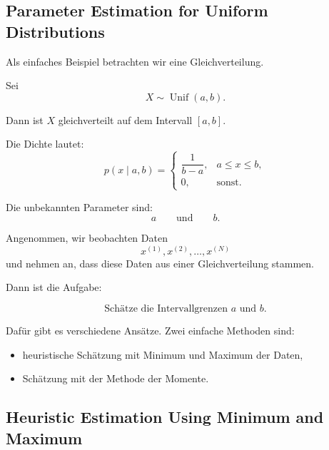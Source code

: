 \documentclass[11pt,a4paper]{scrartcl}
\begin{document}
\subsection{Parameter Estimation for Uniform Distributions}

\begin{notebox}
    Als einfaches Beispiel betrachten wir eine Gleichverteilung.

    Sei
    \[
        X \sim \operatorname{Unif}(a,b).
    \]

    Dann ist \(X\) gleichverteilt auf dem Intervall \([a,b]\).

    Die Dichte lautet:
    \[
        p(x \mid a,b)
        =
        \begin{cases}
            \dfrac{1}{b-a}, & a \leq x \leq b,\\[1em]
            0, & \text{sonst}.
        \end{cases}
    \]

    Die unbekannten Parameter sind:
    \[
        a
        \qquad \text{und} \qquad
        b.
    \]
\end{notebox}

\begin{solutionbox}
    Angenommen, wir beobachten Daten
    \[
        x^{(1)},x^{(2)},\dots,x^{(N)}
    \]
    und nehmen an, dass diese Daten aus einer Gleichverteilung stammen.

    Dann ist die Aufgabe:

    \[
        \text{Schätze die Intervallgrenzen } a \text{ und } b.
    \]

    Dafür gibt es verschiedene Ansätze. Zwei einfache Methoden sind:

    \begin{itemize}
        \item heuristische Schätzung mit Minimum und Maximum der Daten,
        \item Schätzung mit der Methode der Momente.
    \end{itemize}
\end{solutionbox}

\subsection{Heuristic Estimation Using Minimum and Maximum}
\end{document}

